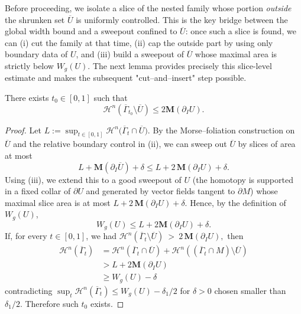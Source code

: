 Before proceeding, we isolate a slice of the nested family whose portion \emph{outside} the shrunken
set $\overline U$ is uniformly controlled. This is the key bridge between the global width bound and
a sweepout confined to $\overline U$: once such a slice is found, we can (i) cut the family at that
time, (ii) cap the outside part by using only boundary data of $U$, and (iii) build a sweepout of
$\overline U$ whose maximal area is strictly below $W_g(U)$. The next lemma provides precisely this
slice-level estimate and makes the subsequent "cut–and–insert" step possible.
\begin{lemma}\label{lem:barU-slice-outside}
There exists $t_0\in[0,1]$ such that
\begin{equation*}
  \mathcal{H}^n(\overline{\Gamma}_{t_0}\setminus \overline U)\leq2\mathbf{M}(\partial_I U).
\end{equation*}
\end{lemma}
\begin{proof}
    Let $L:=\sup_{t\in[0,1]}\mathcal{H}^n\bigl(\overline{\Gamma}_t\cap \overline U)$. By the Morse–foliation construction on $\overline U$ and the relative boundary control in (ii), we can sweep out $\overline U$
    by slices of area at most
\begin{equation*}
  L+\mathbf{M}(\partial_I\overline U)+\delta \le L+2\,\mathbf{M}(\partial_IU)+\delta.
\end{equation*}
Using (iii), we extend this to a good sweepout of $U$ (the homotopy is supported in a fixed collar of $\partial U$ and generated by vector fields tangent to $\partial M$) whose maximal slice area is at most $L+2\,\mathbf{M}(\partial_IU)+\delta$. Hence, by the definition of $W_g(U)$,
\begin{equation*}
  W_g(U)\le L+2\mathbf{M}(\partial_IU)+\delta.
\end{equation*}
If, for every $t\in[0,1]$, we had $\mathcal{H}^n(\overline{\Gamma}_t\setminus \overline U)\ >\ 2\,\mathbf{M}(\partial_IU),$
then
\begin{equation*}
    \begin{split}
        \mathcal{H}^n(\overline{\Gamma}_t) &= \mathcal{H}^n(\overline{\Gamma}_t\cap \overline U) + \mathcal{H}^n( (\overline{\Gamma}_t\cap M)\setminus \overline U)\\
        &> L + 2\mathbf{M}(\partial_IU)\\
        &\geq W_g(U)-\delta
    \end{split}
\end{equation*}
contradicting $\sup_t\mathcal{H}^n(\overline{\Gamma}_t)\le W_g(U)-\delta_1/2$ for $\delta>0$ chosen smaller than $\delta_1/2$.
Therefore such $t_0$ exists.
\end{proof}

